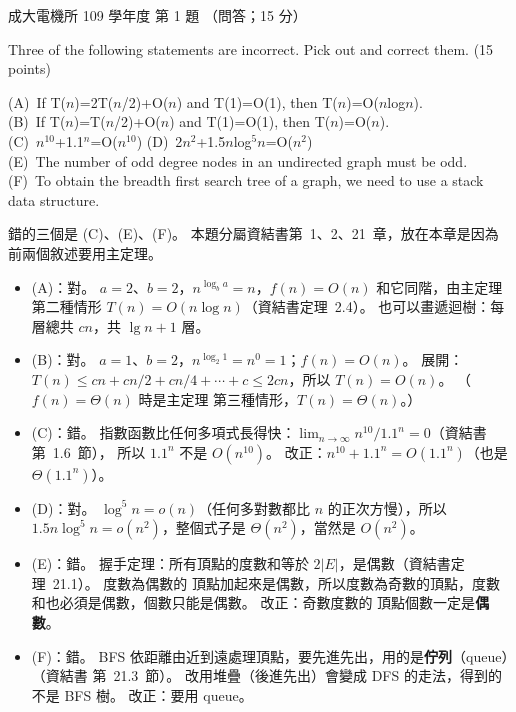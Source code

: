 \begin{pastexam}[label={px:ncku-109-ee-ds-01}]{成大電機所 109 學年度 第 1 題}
（問答；15 分）

Three of the following statements are incorrect. Pick out and correct them. (15 points)

(A)~If T($n$)=2T($n$/2)+O($n$) and T(1)=O(1), then T($n$)=O($n$log$n$).\\
(B)~If T($n$)=T($n$/2)+O($n$) and T(1)=O(1), then T($n$)=O($n$).\\
(C)~$n^{10}$+1.1$^n$=O($n^{10}$) \qquad\qquad (D)~2$n^2$+1.5$n$log$^5n$=O($n^2$)\\
(E)~The number of odd degree nodes in an undirected graph must be odd.\\
(F)~To obtain the breadth first search tree of a graph, we need to use a stack data structure.
\end{pastexam}

\begin{pastsoln}
錯的三個是 (C)、(E)、(F)。 本題分屬資結書第~1、2、21~章，放在本章是因為前兩個敘述要用主定理。

\begin{itemize}
\item (A)：對。 $a = 2$、$b = 2$，$n^{\log_b a} = n$，$f(n) = O(n)$ 和它同階，由主定理第二種情形
$T(n) = O(n \log n)$（資結書定理~2.4）。 也可以畫遞迴樹：每層總共 $cn$，共 $\lg n + 1$ 層。
\item (B)：對。 $a = 1$、$b = 2$，$n^{\log_2 1} = n^0 = 1$；$f(n) = O(n)$。 展開：
$T(n) \le cn + cn/2 + cn/4 + \cdots + c \le 2cn$，所以 $T(n) = O(n)$。 （$f(n) = \Theta(n)$ 時是主定理
第三種情形，$T(n) = \Theta(n)$。）
\item (C)：錯。 指數函數比任何多項式長得快：$\lim_{n\to\infty} n^{10} / 1.1^{n} = 0$（資結書第~1.6~節），
所以 $1.1^{n}$ 不是 $O(n^{10})$。 改正：$n^{10} + 1.1^{n} = O(1.1^{n})$（也是 $\Theta(1.1^{n})$）。
\item (D)：對。 $\log^{5} n = o(n)$（任何多對數都比 $n$ 的正次方慢），所以
$1.5 n \log^{5} n = o(n^{2})$，整個式子是 $\Theta(n^{2})$，當然是 $O(n^{2})$。
\item (E)：錯。 握手定理：所有頂點的度數和等於 $2|E|$，是偶數（資結書定理~21.1）。 度數為偶數的
頂點加起來是偶數，所以度數為奇數的頂點，度數和也必須是偶數，個數只能是偶數。 改正：奇數度數的
頂點個數一定是\textbf{偶數}。
\item (F)：錯。 BFS 依距離由近到遠處理頂點，要先進先出，用的是\textbf{佇列}（queue）（資結書
第~21.3~節）。 改用堆疊（後進先出）會變成 DFS 的走法，得到的不是 BFS 樹。 改正：要用 queue。
\end{itemize}
\end{pastsoln}
